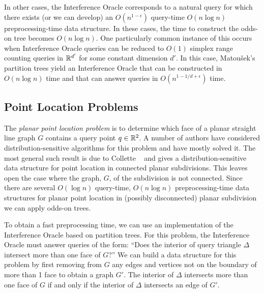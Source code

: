\documentclass{patmorin}
\begin{document}
In other cases, the Interference Oracle corresponds to a natural query for
which there exists (or we can develop) an $O(n^{1-\epsilon})$ query-time
$O(n\log n)$ preprocessing-time data structure.  In these cases, the time
to construct the odds-on tree becomes $O(n\log n)$.  One particularly
common instance of this occurs when Interference Oracle queries can
be reduced to $O(1)$ simplex range counting queries in $\mathbb{R}^{d'}$ for
some constant dimension $d'$.  In this case, Matou\v{s}ek's partition
trees \cite{m92} yield an Interference Oracle that can be constructed in
$O(n\log n)$ time and that can answer queries in $O(n^{1-1/d+\epsilon})$
time. 

\subsection{Point Location Problems}

The \emph{planar point location problem} is to determine which face
of a planar straight line graph $G$ contains a query point $q\in\mathbb{R}^2$.
A number of authors have considered distribution-sensitive algorithms for
this problem \cite{acmr00,amm00,amm01a,amm01b,ammw07,cdilm08,i01,i04}
and have mostly solved it.  The most general such result is due to
Collette \etal\ \cite{cdilm08} and gives a distribution-sensitive
data structure for point location in connected planar subdivisions.
This leaves open the case where the graph, $G$, of the subdivision is not
connected.  Since there are several $O(\log n)$ query-time, $O(n\log n)$
preprocessing-time data structures for planar point location in (possibly
disconnected) planar subdivision \cite{as98,egs86,k83,m90,st86} we can
apply odds-on trees.

To obtain a fast preprocessing time, we can use an
implementation of the Interference Oracle based on partition trees.  For
this problem, the Interference Oracle must answer queries of the form:
``Does the interior of query triangle $\Delta$ intersect more than one face
of $G$?''  We can build a data structure for this problem by first removing
from $G$ any edges and vertices not on the boundary of more than 1 face to
obtain a graph $G'$.  The interior of $\Delta$ intersects more than one
face of $G$ if and only if the interior of $\Delta$ intersects an edge of
$G'$.
\end{document}
